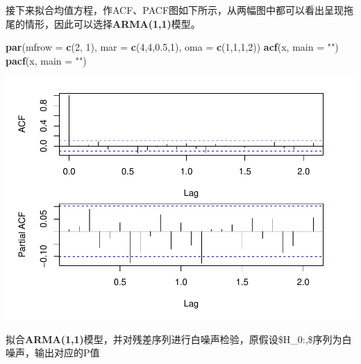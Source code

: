 \documentclass[
]{article}
\newenvironment{Shaded}{\begin{snugshade}}{\end{snugshade}}
\newcommand{\ControlFlowTok}[1]{\textcolor[rgb]{0.13,0.29,0.53}{\textbf{#1}}}
\newcommand{\DataTypeTok}[1]{\textcolor[rgb]{0.13,0.29,0.53}{#1}}
\newcommand{\DecValTok}[1]{\textcolor[rgb]{0.00,0.00,0.81}{#1}}
\newcommand{\FloatTok}[1]{\textcolor[rgb]{0.00,0.00,0.81}{#1}}
\newcommand{\KeywordTok}[1]{\textcolor[rgb]{0.13,0.29,0.53}{\textbf{#1}}}
\newcommand{\NormalTok}[1]{#1}
\newcommand{\OperatorTok}[1]{\textcolor[rgb]{0.81,0.36,0.00}{\textbf{#1}}}
\newcommand{\StringTok}[1]{\textcolor[rgb]{0.31,0.60,0.02}{#1}}
\begin{document}
接下来拟合均值方程，作ACF、PACF图如下所示，从两幅图中都可以看出呈现拖尾的情形，因此可以选择\textbf{ARMA(1,1)}模型。

\begin{Shaded}
\begin{Highlighting}[]
\KeywordTok{par}\NormalTok{(}\DataTypeTok{mfrow =} \KeywordTok{c}\NormalTok{(}\DecValTok{2}\NormalTok{, }\DecValTok{1}\NormalTok{), }\DataTypeTok{mar =} \KeywordTok{c}\NormalTok{(}\DecValTok{4}\NormalTok{,}\DecValTok{4}\NormalTok{,}\FloatTok{0.5}\NormalTok{,}\DecValTok{1}\NormalTok{), }\DataTypeTok{oma =} \KeywordTok{c}\NormalTok{(}\DecValTok{1}\NormalTok{,}\DecValTok{1}\NormalTok{,}\DecValTok{1}\NormalTok{,}\DecValTok{2}\NormalTok{))}
\KeywordTok{acf}\NormalTok{(x, }\DataTypeTok{main =} \StringTok{""}\NormalTok{)}
\KeywordTok{pacf}\NormalTok{(x, }\DataTypeTok{main =} \StringTok{""}\NormalTok{)}
\end{Highlighting}
\end{Shaded}

\begin{center}
	\includegraphics{ass_4_files/figure-latex/unnamed-chunk-4-1.pdf}
\end{center}

拟合\textbf{ARMA(1,1)}模型，并对残差序列进行白噪声检验，原假设\$H\_0:,\$序列为白噪声，输出对应的P值

\begin{Shaded}
\end{Shaded}
\end{document}
